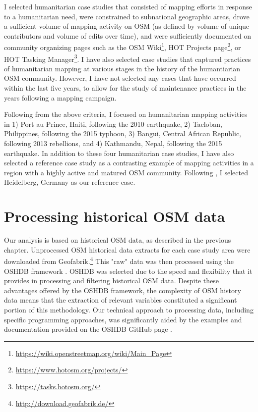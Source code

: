 I selected humanitarian case studies that consisted of mapping efforts in response to a humanitarian need, were constrained to subnational geographic areas, drove a sufficient volume of mapping activity on OSM (as defined by volume of unique contributors and volume of edits over time), and were sufficiently documented on community organizing pages such as the OSM Wiki\footnote{\url{https://wiki.openstreetmap.org/wiki/Main_Page}}, HOT Projects page\footnote{\url{https://www.hotosm.org/projects/}}, or HOT Tasking Manager\footnote{\url{https://tasks.hotosm.org/}}. I have also selected case studies that captured practices of humanitarian mapping at various stages in the history of the humantiarian OSM community. However, I have not selected any cases that have occurred within the last five years, to allow for the study of maintenance practices in the years following a mapping campaign.  

Following from the above criteria, I focused on humanitarian mapping activities in 1) Port au Prince, Haiti, following the 2010 earthquake, 2) Tacloban, Philippines, following the 2015 typhoon, 3) Bangui, Central African Republic, following 2013 rebellions, and 4) Kathmandu, Nepal, following the 2015 earthquake. In addition to these four humanitarian case studies, I have also selected a reference case study as a contrasting example of mapping activities in a region with a highly active and matured OSM community. Following \textcite{anderson_crowd_2018}, I selected Heidelberg, Germany as our reference case.

\section{Processing historical OSM data}
\label{sec:history}

Our analysis is based on historical OSM data, as described in the previous chapter. Unprocessed OSM historical data extracts for each case study area were downloaded from Geofabrik.\footnote{\url{http://download.geofabrik.de/}} This "raw" data was then processed using the OSHDB framework \parencite{raifer_oshdb_2019}. OSHDB was selected due to the speed and flexibility that it provides in processing and filtering historical OSM data. Despite these advantages offered by the OSHDB framework, the complexity of OSM history data means that the extraction of relevant variables constituted a significant portion of this methodology. Our technical approach to processing data, including specific programming approaches, was significantly aided by the examples and documentation provided on the OSHDB GitHub page \parencite{heidelberg_institute_for_geoinformation_technology_oshdb_2020}.

